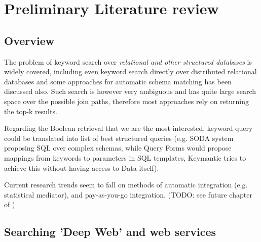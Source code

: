 \section{Preliminary Literature review}


\subsection{Overview}


The problem of keyword search over \textit{relational and other structured databases} is widely covered,  including even keyword search directly over distributed relational databases\cite[ch.16]{principles_data_integration} and some approaches for automatic schema matching has been discussed also. Such search is however very ambiguous and has quite large search space over the possible join paths, therefore most approaches rely on returning the top-k results.

Regarding the Boolean retrieval that we are the most interested, keyword query could be translated into list of best structured queries (e.g. SODA system proposing SQL over complex schemas, while Query Forms would propose mappings from keywords to parameters in SQL templates, Keymantic tries to achieve this without having access to Data itself). 


{\color{red}Current research trends seem to fall on methods of automatic integration (e.g. statistical mediator), and pay-as-you-go integration. (TODO: see future chapter of \cite{principles_data_integration})}


\subsection{Searching 'Deep Web' and web services}

